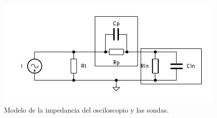 \begin{figure}[H]
    \centering
    \includegraphics[width=\columnwidth]{img/circ/oscilloscope-probes.pdf}
    \caption{Modelo de la impedancia del osciloscopio y las sondas.}
    \label{fig:oscilloscope-probes}
\end{figure}